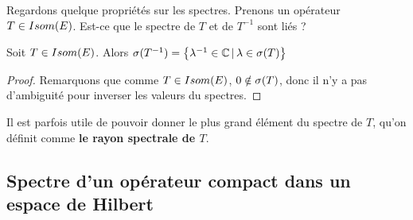 Regardons quelque propriétés sur les spectres. Prenons un opérateur $T \in
Isom(E)$. Est-ce que le spectre de $T$ et de $T^{-1}$ sont liés ?

\begin{proposition}
	Soit $T \in Isom(E)$. Alors $\sigma(T^{-1}) =
	\left\{\lambda^{-1} \in \mathbb{C} \, | \, \lambda \in \sigma(T) \right\}$
\end{proposition}

\begin{proof}
	Remarquons que comme $T \in Isom(E)$, $0 \notin \sigma(T)$,
	donc il n'y a pas d'ambiguité pour inverser les valeurs du spectres.
\end{proof}

Il est parfois utile de pouvoir donner le plus grand élément du spectre de $T$, qu'on
définit comme \textbf{le rayon spectrale de $T$}.




\subsection{Spectre d'un opérateur compact dans un espace de Hilbert}
